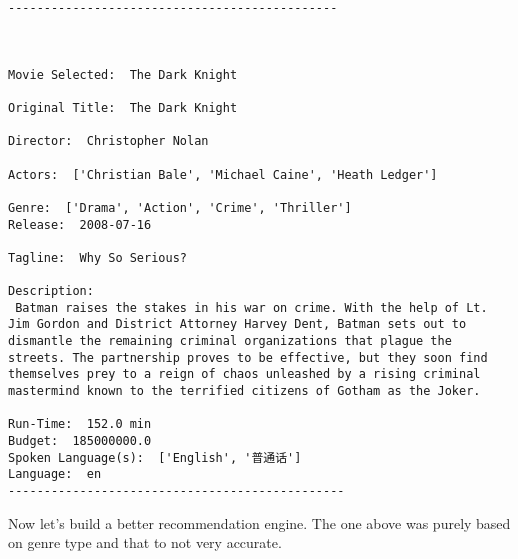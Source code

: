 \documentclass[11pt]{article}
\begin{document}
    \begin{Verbatim}[commandchars=\\\{\}]
----------------------------------------------



Movie Selected:  The Dark Knight

Original Title:  The Dark Knight

Director:  Christopher Nolan

Actors:  ['Christian Bale', 'Michael Caine', 'Heath Ledger']

Genre:  ['Drama', 'Action', 'Crime', 'Thriller']
Release:  2008-07-16

Tagline:  Why So Serious?

Description: 
 Batman raises the stakes in his war on crime. With the help of Lt. Jim Gordon and District Attorney Harvey Dent, Batman sets out to dismantle the remaining criminal organizations that plague the streets. The partnership proves to be effective, but they soon find themselves prey to a reign of chaos unleashed by a rising criminal mastermind known to the terrified citizens of Gotham as the Joker.

Run-Time:  152.0 min
Budget:  185000000.0
Spoken Language(s):  ['English', '普通话']
Language:  en
-----------------------------------------------

    \end{Verbatim}

    Now let's build a better recommendation engine. The one above was purely
based on genre type and that to not very accurate.
\end{document}
